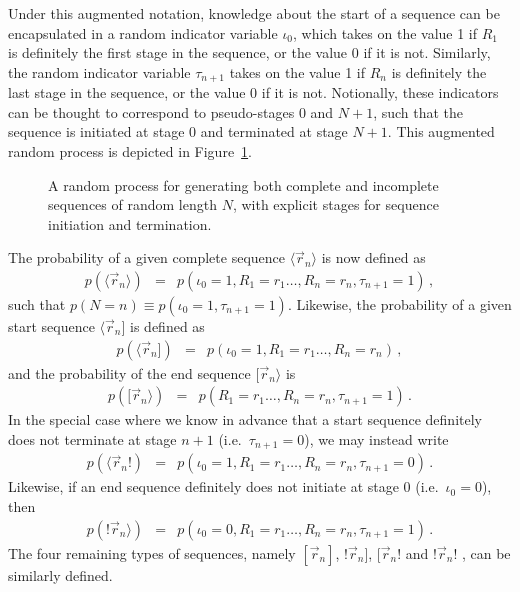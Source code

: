 \documentclass[a4paper]{article}
\begin{document}
Under this augmented notation, knowledge about the start of a sequence can be encapsulated in 
a random indicator variable $\iota_0$, which takes on the value 1 if $R_1$ is definitely the first stage in the
sequence, or the value 0 if it is not. Similarly, the random indicator variable $\tau_{n+1}$
takes on the value 1 if $R_n$ is definitely the last stage in the sequence, or the value 0 if it is not.
Notionally, these indicators can be thought to correspond to pseudo-stages 0 and $N+1$, such that
the sequence is initiated at stage 0 and terminated at stage $N+1$.
This augmented random process is depicted in Figure~\ref{fig:random-process}.
\begin{figure}[hbt]
\centering
{}
\caption{A random process for generating both complete and incomplete sequences of random length $N$,
with explicit stages for sequence initiation and termination.}
\label{fig:random-process}
\end{figure}

The probability of a given complete sequence $\langle\vec{r}_n\rangle$ is now defined as
\begin{eqnarray}
   p(\langle\vec{r}_n\rangle)
& = & p(\iota_0=1,R_1=r_1\ldots,R_n=r_n,\tau_{n+1}=1)
\,,
\end{eqnarray}
such that $p(N=n)\equiv p(\iota_0=1,\tau_{n+1}=1)$.
Likewise, the probability
of a given start sequence $\langle\vec{r}_n]$ is defined as
\begin{eqnarray}
p(\langle\vec{r}_n]) & = & p(\iota_0=1,R_1=r_1\ldots,R_n=r_n)\,,
\end{eqnarray}
and the probability of the end sequence $[\vec{r}_n\rangle$ is
\begin{eqnarray}
p([\vec{r}_n\rangle)
& = & p(R_1=r_1\ldots,R_n=r_n,\tau_{n+1}=1)\,.
\end{eqnarray}
In the special case where we know in advance that a start sequence definitely does not terminate
at stage $n+1$ (i.e.\ $\tau_{n+1}=0$),  we may instead write
\begin{eqnarray}
p(\langle\vec{r}_n!)
& = & p(\iota_0=1,R_1=r_1\ldots,R_n=r_n,\tau_{n+1}=0)\,.
\end{eqnarray}
Likewise, if an end sequence definitely does not initiate at stage
0 (i.e.\ $\iota_0=0$), then
\begin{eqnarray}
p(!\vec{r}_n\rangle)
& = & p(\iota_0=0,R_1=r_1\ldots,R_n=r_n,\tau_{n+1}=1)\,.
\end{eqnarray}
The four remaining types of sequences, namely $[\vec{r}_n]$, $!\vec{r}_n]$, $[\vec{r}_n!$ and $!\vec{r}_n!$ , can be similarly defined.
\end{document}
